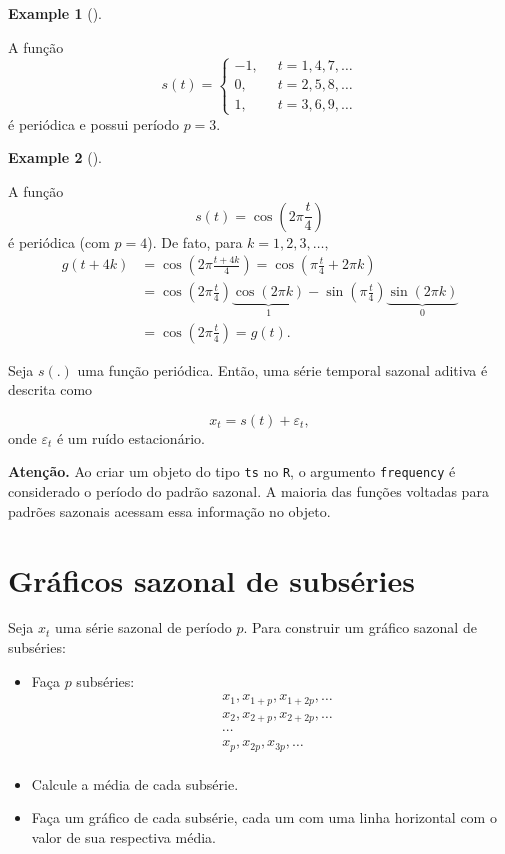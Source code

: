 \documentclass[
  letterpaper,
  DIV=11,
  numbers=noendperiod]{scrartcl}
\theoremstyle{definition}
\newtheorem{example}{Example}[chapter]
\theoremstyle{definition}
\theoremstyle{plain}
\theoremstyle{plain}
\theoremstyle{remark}
\begin{document}
\begin{example}[]\protect\hypertarget{exm-periodica}{}\label{exm-periodica}

A função \[s(t)=\left\{ \begin{align}
-1, &\;\;t=1,4,7,\ldots\\
0, &\;\; t=2,5,8,\ldots\\
1,&\;\;t=3,6,9,\ldots
\end{align}
\right.
\] é periódica e possui período \(p=3\).

\end{example}

\begin{example}[]\protect\hypertarget{exm-periodica2}{}\label{exm-periodica2}

A função \[s(t)=\cos\left(2\pi\frac{t}{4}\right)\] é periódica (com
\(p=4\)). De fato, para \(k=1,2,3,\ldots,\) \begin{align*}
    g(t+4k) &= \cos\left(2\pi\frac{t+4k}{4}\right)=\cos\left( \pi\frac{t}{4}+2\pi k\right)\\
    &=\cos\left( 2\pi\frac{t}{4}\right)\underbrace{\cos\left(2\pi k\right)}_\text{1} - \sin\left( \pi\frac{t}{4}\right)\underbrace{\sin\left(2\pi k\right)}_\text{0}\\
    &=\cos\left(2\pi\frac{t}{4}\right) = g(t).  
\end{align*}

\end{example}

Seja \(s(.)\) uma função periódica. Então, uma série temporal sazonal
aditiva é descrita como

\[x_t=s(t)+\varepsilon_t,\] onde \(\varepsilon_t\) é um ruído
estacionário.

\textbf{Atenção.} Ao criar um objeto do tipo \texttt{ts} no \texttt{R},
o argumento \texttt{frequency} é considerado o período do padrão
sazonal. A maioria das funções voltadas para padrões sazonais acessam
essa informação no objeto.

\section{Gráficos sazonal de
subséries}\label{gruxe1ficos-sazonal-de-subsuxe9ries}

Seja \(x_t\) uma série sazonal de período \(p\). Para construir um
gráfico sazonal de subséries:

\begin{itemize}
\item
  Faça \(p\) subséries: \begin{align*}
        &x_1,x_{1+p},x_{1+2p},\ldots \\
        &x_{2},x_{2+p},x_{2+2p},\ldots\\
        &\cdots\\
        &x_{p},x_{2p},x_{3p},\ldots\\       
        \end{align*}
\item
  Calcule a média de cada subsérie.
\item
  Faça um gráfico de cada subsérie, cada um com uma linha horizontal com
  o valor de sua respectiva média.
\end{itemize}
\end{document}
